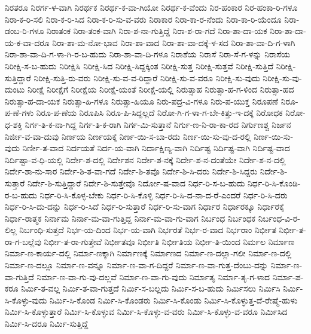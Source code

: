 {ನಿರತರೂ
ನಿರರ್ಗ-ಳ-ವಾಗಿ
ನಿರರ್ಥಕ
ನಿರರ್ಥ-ಕ-ವಾ-ಗಿಯೋ
ನಿರರ್ಥ-ಕ-ವೆಂದು
ನಿರ-ಹಂಕಾರ
ನಿರ-ಹಂಕಾ-ರಿ-ಗಳೂ
ನಿರಾ-ಕ-ರಿ-ಸಲಿ
ನಿರಾ-ಕ-ರಿ-ಸಿದ
ನಿರಾ-ಕ-ರಿ-ಸು-ವ-ವರು
ನಿರಾಕಾರ
ನಿರಾ-ಕಾ-ರ-ನೆಂದು
ನಿರಾ-ಕಾ-ರಿ-ಯೆಂದೂ
ನಿರಾ-ಡಂಬ-ರಿ-ಗಳೂ
ನಿರಾತಂಕ
ನಿರಾ-ತಂಕ-ವಾಗಿ
ನಿರಾ-ಶ-ನಾ-ಗುತ್ತಿದ್ದೆ
ನಿರಾ-ಶ-ರಾ-ಗದೆ
ನಿರಾ-ಶಾ-ದಾ-ಯಕ
ನಿರಾ-ಶಾ-ದಾ-ಯ-ಕ-ವಾ-ದರೂ
ನಿರಾ-ಶಾ-ಮ-ನೋ-ಭಾವ
ನಿರಾ-ಶಾ-ವಾದ
ನಿರಾ-ಶಾ-ವಾ-ದಕ್ಕೆ-ಳ-ಸದ
ನಿರಾ-ಶಾ-ವಾ-ದಿ-ಗ-ಳಾಗಿ
ನಿರಾ-ಶಾ-ವಾ-ದಿ-ಗ-ಳಾ-ಗಿ-ರ-ಬ-ಹುದು
ನಿರಾ-ಶಾ-ವಾ-ದಿ-ಗಳೂ
ನಿರಾಶೆಯ
ನಿರಾಸೆ
ನಿರಾ-ಸೆ-ಗ-ಳನ್ನು
ನಿರಾಸೆಯ
ನಿರೀಕ್ಷಿ-ಸ-ಬ-ಹುದು
ನಿರೀಕ್ಷಿಸಿ
ನಿರೀಕ್ಷಿ-ಸಿದ
ನಿರೀಕ್ಷಿ-ಸಿದ್ದಕ್ಕಿಂತ
ನಿರೀಕ್ಷಿ-ಸುತ್ತ
ನಿರೀಕ್ಷಿ-ಸುತ್ತವೆ
ನಿರೀಕ್ಷಿ-ಸುತ್ತಿದೆ
ನಿರೀಕ್ಷಿ-ಸುತ್ತಿದ್ದಾರೆ
ನಿರೀಕ್ಷಿ-ಸುತ್ತಿ-ರು-ವರು
ನಿರೀಕ್ಷಿ-ಸು-ವ-ವ-ರಿದ್ದಾರೆ
ನಿರೀಕ್ಷಿ-ಸು-ವ-ವರೂ
ನಿರೀಕ್ಷಿ-ಸು-ವುದು
ನಿರೀಕ್ಷಿ-ಸು-ವು-ದುಂಟು
ನಿರೀಕ್ಷೆ
ನಿರೀಕ್ಷೆಗೆ
ನಿರೀಕ್ಷೆಯ
ನಿರೀಕ್ಷೆ-ಯಂತೆ
ನಿರೀಕ್ಷೆ-ಯಲ್ಲಿ
ನಿರುತ್ಸಾಹ
ನಿರುತ್ಸಾ-ಹ-ಗ-ಳಿಂದ
ನಿರುತ್ಸಾ-ಹದ
ನಿರುತ್ಸಾ-ಹ-ದಾ-ಯಕ
ನಿರುತ್ಸಾ-ಹಿ-ಗಳೂ
ನಿರುತ್ಸಾ-ಹಿಯೂ
ನಿರು-ಪದ್ರ-ವಿ-ಗಳೂ
ನಿರು-ಪ-ಯುಕ್ತ
ನಿರೂಪಣೆ
ನಿರೂ-ಪ-ಣೆ-ಗಳು
ನಿರೂ-ಪ-ಣೆಯ
ನಿರೂಪಿಸಿ
ನಿರೂ-ಪಿ-ಸಿದ್ದಲ್ಲದೆ
ನಿರೋ-ಗಿ-ಗ-ಳಾ-ಗ-ಬೇ-ಕಿತ್ತು-ಇ-ದಕ್ಕೆ
ನಿರೋಧಕ
ನಿರೋ-ಧ-ಶಕ್ತಿ
ನಿರ್ಗ-ತಿ-ಕ-ನಾ-ಗಿದ್ದ
ನಿರ್ಗ-ತಿ-ಕ-ರಾಗಿ
ನಿರ್ಗ-ಮಿ-ಸುತ್ತಾನೆ
ನಿರ್ಗು-ಣ-ನಿ-ರಾ-ಕಾ-ರದ
ನಿರ್ಗುಣಶ್ಚ
ನಿರ್ಜನ
ನಿರ್ಜೀ-ವ-ವಾ-ದುವು
ನಿರ್ಣಯ
ನಿರ್ಣಯಕ್ಕೆ
ನಿರ್ಣ-ಯಿ-ಸ-ಬಾ-ರದು
ನಿರ್ಣ-ಯಿ-ಸು-ವು-ದ-ರಲ್ಲಿ
ನಿರ್ಣ-ಯಿ-ಸು-ವುದು
ನಿರ್ಣೀ-ತ-ವಾದ
ನಿರ್ದಯತೆ
ನಿರ್ದ-ಯ-ವಾಗಿ
ನಿರ್ದಾಕ್ಷಿಣ್ಯ-ವಾಗಿ
ನಿರ್ದಿಷ್ಟ
ನಿರ್ದಿಷ್ಟ-ವಾಗಿ
ನಿರ್ದಿಷ್ಟ-ವಾದ
ನಿರ್ದಿಷ್ಟಾ-ವ-ಧಿ-ಯಲ್ಲಿ
ನಿರ್ದೇ-ಶ-ದಲ್ಲಿ
ನಿರ್ದೇಶನ
ನಿರ್ದೇ-ಶ-ನಕ್ಕೆ
ನಿರ್ದೇ-ಶ-ನ-ದಂತೆಯೇ
ನಿರ್ದೇ-ಶ-ನ-ದಲ್ಲಿ
ನಿರ್ದೇ-ಶಾ-ನು-ಸಾರ
ನಿರ್ದೇ-ಶಿ-ತ-ವಾ-ಗದೆ
ನಿರ್ದೇ-ಶಿ-ತವೊ
ನಿರ್ದೇ-ಶಿ-ಸಿ-ದರು
ನಿರ್ದೇ-ಶಿ-ಸಿದ್ದರು
ನಿರ್ದೇ-ಶಿ-ಸುತ್ತಾರೆ
ನಿರ್ದೇ-ಶಿ-ಸುತ್ತಿದ್ದಾರೆ
ನಿರ್ದೇ-ಶಿ-ಸುತ್ತೇವೊ
ನಿರ್ದೋ-ಷ-ವಾದ
ನಿರ್ಧ-ರಿ-ಸ-ಬ-ಹುದು
ನಿರ್ಧ-ರಿ-ಸಿ-ಕೊಂಡಿ-ರ-ಬ-ಹುದು
ನಿರ್ಧ-ರಿ-ಸಿ-ಕೊಳ್ಳ-ಬೇಕು
ನಿರ್ಧ-ರಿ-ಸಿ-ಕೊಳ್ಳಿ
ನಿರ್ಧ-ರಿ-ಸಿ-ದ-ನಾ-ದ-ರೆ-ಎಂದರೆ
ನಿರ್ಧ-ರಿ-ಸಿ-ದರು
ನಿರ್ಧ-ರಿ-ಸಿ-ದು-ದನ್ನು
ನಿರ್ಧ-ರಿ-ಸಿದೆ
ನಿರ್ಧ-ರಿ-ಸುತ್ತಾರೆ
ನಿರ್ಧ-ರಿ-ಸು-ವಾಗ
ನಿರ್ಧಾರ
ನಿರ್ಧಾರಕ್ಕೂ
ನಿರ್ಧಾರಕ್ಕೆ
ನಿರ್ಧಾ-ರಾತ್ಮಕ
ನಿರ್ನಾಮ
ನಿರ್ನಾ-ಮ-ವಾ-ಗುತ್ತಿದ್ದ
ನಿರ್ನಾ-ಮ-ವಾ-ಗು-ವಾಗ
ನಿರ್ಬಂಧ
ನಿರ್ಬಂಧಕ
ನಿರ್ಬಂಧ-ವಿ-ರ-ಲಿಲ್ಲ
ನಿರ್ಬಂಧಿ-ಸುತ್ತದೆ
ನಿರ್ಭ-ಯ-ದಿಂದ
ನಿರ್ಭ-ಯ-ವಾಗಿ
ನಿರ್ಭರತೆ
ನಿರ್ಭ-ರ-ವಾದ
ನಿರ್ಭರಾಂ
ನಿರ್ಭೀತ
ನಿರ್ಭೀ-ತ-ರಾ-ಗ-ಬಲ್ಲೆವು
ನಿರ್ಭೀ-ತ-ರಾ-ಗುತ್ತೇವೆ
ನಿರ್ಭೀತವೂ
ನಿರ್ಭೀತಿ
ನಿರ್ಭೀತಿಯ
ನಿರ್ಭೀ-ತಿ-ಯಿಂದ
ನಿರ್ಮಲ
ನಿರ್ಮಾಣ
ನಿರ್ಮಾ-ಣ-ಕಾರ್ಯ-ದಲ್ಲಿ
ನಿರ್ಮಾ-ಣಕ್ಕಾಗಿ
ನಿರ್ಮಾಣಕ್ಕೆ
ನಿರ್ಮಾಣದ
ನಿರ್ಮಾ-ಣ-ದಲ್ಲಾ-ಗಲೀ
ನಿರ್ಮಾ-ಣ-ದಲ್ಲಿ
ನಿರ್ಮಾ-ಣ-ದಲ್ಲೂ
ನಿರ್ಮಾ-ಣ-ವನ್ನೂ
ನಿರ್ಮಾ-ಣ-ವಾ-ಗ-ದಿದ್ದರೆ
ನಿರ್ಮಾ-ಣ-ವಾ-ಗುತ್ತ-ದೆಂಬು-ದನ್ನು
ನಿರ್ಮಾ-ಣ-ವಾ-ಗುತ್ತಿದೆ
ನಿರ್ಮಾ-ಣ-ವಾ-ಗು-ವು-ದಲ್ಲವೆ
ನಿರ್ಮಾ-ಣ-ವಾ-ಗು-ವುದು
ನಿರ್ಮಾತೃ
ನಿರ್ಮಾ-ತೃ-ಗ-ಳಾದ
ನಿರ್ಮಾ-ಪ-ಕರೂ
ನಿರ್ಮಿ-ತ-ವಲ್ಲ
ನಿರ್ಮಿ-ತ-ವಾ-ಗುತ್ತದೆ
ನಿರ್ಮಿ-ಸ-ಬಲ್ಲದು
ನಿರ್ಮಿ-ಸ-ಬ-ಹುದು
ನಿರ್ಮಿಸಲು
ನಿರ್ಮಿಸಿ
ನಿರ್ಮಿ-ಸಿ-ಕೊಳ್ಳು-ವುದು
ನಿರ್ಮಿ-ಸಿ-ಕೊಂಡ
ನಿರ್ಮಿ-ಸಿ-ಕೊಂಡರು
ನಿರ್ಮಿ-ಸಿ-ಕೊಂಡು
ನಿರ್ಮಿ-ಸಿ-ಕೊಳ್ಳುತ್ತ-ದೆ-ರೇಷ್ಮೆ-ಹುಳು
ನಿರ್ಮಿ-ಸಿ-ಕೊಳ್ಳುತ್ತಾರೆ
ನಿರ್ಮಿ-ಸಿ-ಕೊಳ್ಳುವ
ನಿರ್ಮಿ-ಸಿ-ಕೊಳ್ಳು-ವ-ವರು
ನಿರ್ಮಿ-ಸಿ-ಕೊಳ್ಳು-ವ-ವರೂ
ನಿರ್ಮಿಸಿದ
ನಿರ್ಮಿ-ಸಿ-ದರೂ
ನಿರ್ಮಿ-ಸುತ್ತಿದ್ದೆ
}
